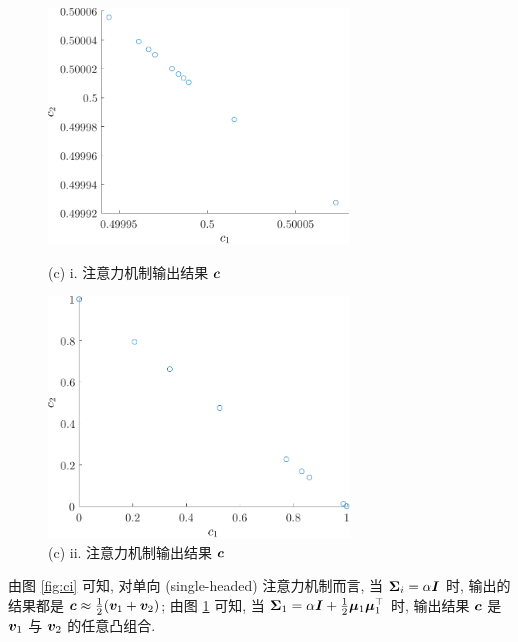 \documentclass{article}
\begin{document}
\begin{figure}[htbp]
  \centering
  \begin{minipage}[t]{0.48\textwidth}
    \centering
    \includegraphics[width=8cm]{ci.pdf}
    \caption{(c) i. 注意力机制输出结果 $\bm{c}$}
    \label{fig:ci}
  \end{minipage}
  \begin{minipage}[t]{0.48\textwidth}
    \centering
    \includegraphics[width=8cm]{cii.pdf}
    \caption{(c) ii. 注意力机制输出结果 $\bm{c}$}
    \label{fig:cii}
  \end{minipage}
\end{figure}

由图 \ref{fig:ci} 可知, 对单向 (single-headed) 注意力机制而言, 当 $\bm{\Sigma}_{i}=\alpha \bm{I}$ 时, 输出的结果都是 $\bm{c}\approx\frac{1}{2}(\bm{v}_{1}+\bm{v}_{2})$; 由图 \ref{fig:cii} 可知, 当 $\bm{\Sigma}_{1}=\alpha \bm{I}+\frac{1}{2}\bm{\mu}_{1} \bm{\mu}_{1}^{\top}$ 时, 输出结果 $\bm{c}$ 是 $\bm{v}_1$ 与 $\bm{v}_2$ 的任意凸组合.
\end{document}
